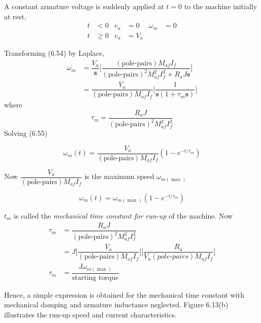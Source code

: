 \documentclass[a4paper,numbers=noenddot,12pt]{scrbook}
\begin{document}
    A constant armature voltage is suddenly applied at $t = 0$ to the machine initially at rest,
    \begin{align*}
        t & < 0 & v_a & = 0 & \omega_m & = 0\\
        t & \ge 0 & v_a & = V_a
    \end{align*}

    Transforming (6.54) by Laplace,
    \begin{align}
        \overline{\omega_m} & = \dfrac{V_a}{\mathbf{s}} \bigg[ \dfrac{(\text{pole-pairs}) M_{af} I_f}{{(\text{pole-pairs})}^2 M_{af}^2 I_f^2 + R_a J \mathbf{s}} \bigg] \nonumber \\
        & = \dfrac{V_a}{(\text{pole-pairs}) M_{af} I_f} \bigg[ \dfrac{1}{\mathbf{s}(1 + \tau_m \mathbf{s})}\bigg]
        \label{}
    \end{align}
    where
    \begin{equation}
        \tau_m = \dfrac{R_a J}{{(\text{pole-pairs})}^2 M_{af}^2 I_f^2}
        \label{}
    \end{equation}
    Solving (6.55)

    \begin{equation}
        \omega_m (t) = \dfrac{V_a}{(\text{pole-pairs}) M_{af} I_f} (1-e^{-t / \tau_m})
        \label{}
    \end{equation}

    Now $\dfrac{V_a}{(\text{pole-pairs}) M_{af} I_f}$ is the maximum speed $\omega_{m(\max)}$

    \begin{equation}
        \omega_m(t) = \omega_{m(\max)} (1 - e^{-t / \tau_m})
        \label{}
    \end{equation}

    $t_m$ is called the \textit{mechanical time constant for run-up} of the machine.
    Now
    \begin{align}
        \tau_m & = \dfrac{R_a J}{{(\text{pole-pairs})}^2 M_{af}^2 I_f^2} \nonumber \\
        & = J \bigg[ \dfrac{V_a}{(\text{pole-pairs}) M_{af} I_f}\bigg] \bigg[\dfrac{R_a}{V_a (\textit{pole-pairs}) M_{af} I_f}\bigg] \nonumber \\
        \tau_m & = \dfrac{J \omega_{m(\max)}}{\text{starting torque}}
        \label{}
    \end{align}

    Hence, a simple expression is obtained for the mechanical time constant with mechanical damping and armature inductance neglected. Figure 6.13(b) illustrates the run-up speed and current characteristics.
\end{document}
